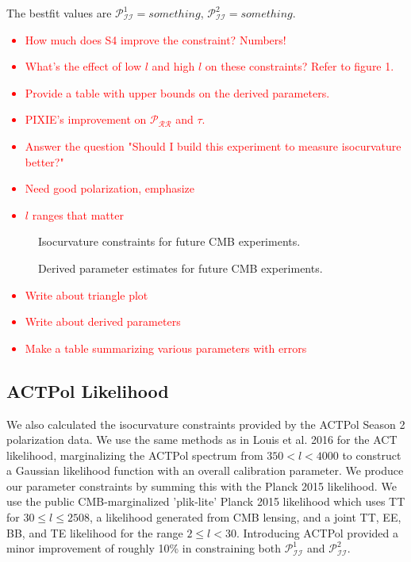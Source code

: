 \documentclass{emulateapj}
\newcommand\writingnote[1]{\textcolor{red}{#1}}
\newcommand{\prr}{ \mathcal{P}_{\mathcal{R}\mathcal{R}} }
\newcommand{\pii}{ \mathcal{P}_{\mathcal{I}\mathcal{I}} }
\begin{document}
The bestfit values are $\pii^1 = something$, $\pii^2 = something$.

\writingnote{
  \begin{itemize}
    \item How much does S4 improve the constraint? Numbers! 
    \item What's the effect of low $l$ and high $l$ on these constraints? Refer to figure 1. 
    \item Provide a table with upper bounds on the derived parameters.
    \item PIXIE's improvement on $\prr$ and $\tau$. 
    \item Answer the question "Should I build this experiment to measure isocurvature better?"
    \item Need good polarization, emphasize
    \item $l$ ranges that matter
  \end{itemize}
}

\afterpage{\clearpage}
\begin{figure}[p]
\caption{Isocurvature constraints for future CMB experiments.\label{fig:triangleplots}}
\end{figure}



\afterpage{\clearpage}
\begin{figure}[p]
\caption{Derived parameter estimates for future CMB experiments.\label{fig:derivedparams}}
\end{figure}

\writingnote{
    \begin{itemize}
        \item Write about triangle plot
        \item Write about derived parameters
        \item Make a table summarizing various parameters with errors
    \end{itemize}
}




\subsection{ACTPol Likelihood}\label{actpol}

We also calculated the isocurvature constraints provided by the ACTPol Season 2 polarization data. We use the same methods as in Louis et al. 2016 for the ACT likelihood, marginalizing the ACTPol spectrum from $350 < l < 4000$ to construct a Gaussian likelihood function with an overall calibration parameter. We produce our parameter constraints by summing this with the Planck 2015 likelihood. We use the public CMB-marginalized 'plik-lite' Planck 2015 likelihood which uses TT for $30 \leq l \leq 2508$, a likelihood generated from CMB lensing, and a joint TT, EE, BB, and TE likelihood for the range $2 \leq l < 30$. Introducing ACTPol provided a minor improvement of roughly 10\% in constraining both $\pii^1$ and $\pii^2$.
\end{document}
